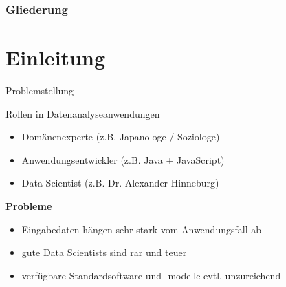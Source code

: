 \documentclass{beamer}
\begin{document}
\begin{frame}
\frametitle{Gliederung}
\tableofcontents
\end{frame}

\section{Einleitung}
\begin{frame}[t]{Problemstellung}
\vspace*{0.7em}
\begin{block}{Rollen in Datenanalyseanwendungen}
	\begin{itemize}
	\setlength{\itemsep}{.4em}
	\item Domänenexperte \hfill (z.B. Japanologe / Soziologe)
	\item Anwendungsentwickler \hfill (z.B. Java + JavaScript)
	\item Data Scientist \hfill (z.B. Dr. Alexander Hinneburg)
	\end{itemize}
\end{block}\pause

\textbf{Probleme}
\begin{itemize}
	\item Eingabedaten hängen sehr stark vom Anwendungsfall ab
	\item gute Data Scientists sind rar und teuer
	\item verfügbare Standardsoftware und -modelle evtl. unzureichend
\end{itemize}


\end{frame}
\end{document}
